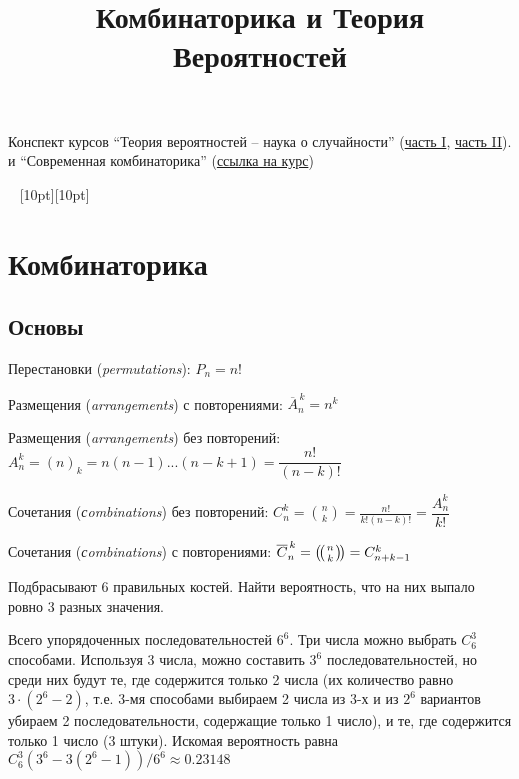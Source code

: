 \documentclass[a4paper,12pt,fleqn]{article}
\title{Комбинаторика и Теория Вероятностей}
\author{}
\date{}
\newenvironment{onsamepage} {\begin{minipage}{\textwidth}} {\end{minipage}}
\numberwithin{figure}{section}
\theoremstyle{definition}
\newcommand{\mbinom}[2] { \left( \! \middle( \genfrac{}{}{0pt}{}{#1}{#2} \middle) \! \right) }
\def\vignette{\vspace{48pt} \noindent \hrulefill~
	          \raisebox{-8pt}[10pt][10pt]{\Huge\ding{102}}
	          ~\hrulefill}
\begin{document}
\maketitle
Конспект курсов ``Теория вероятностей -- наука о случайности''
(\href{https://stepik.org/course/2911}{часть I},
\href{https://stepik.org/course/3209}{часть II}).
и ``Современная комбинаторика''
(\href{https://www.coursera.org/learn/modern-combinatorics/home/welcome}{ссылка на курс})
\tableofcontents


\vignette
\section{Комбинаторика}

\subsection{Основы}

Перестановки (\textit{permutations}): $P_n = n!$

Размещения (\textit{arrangements}) с повторениями:
$\overline{A}_n^{\,k} = n^k$

Размещения (\textit{arrangements}) без повторений:
$A_n^k = (n)_k = n(n-1)...(n-k+1) = \dfrac{n!}{(n-k)!}$

Сочетания (\textit{сombinations}) без повторений:
$C_n^k = \binom{n}{k} = \frac{n!}{k!(n-k)!} = \dfrac{A_n^k}{k!}$

Сочетания (\textit{сombinations}) с повторениями:
$\overline{C}_n^{\,k} = \mbinom{n}{k} = C_{n+k-1}^k$

\medskip
\begin{onsamepage}
\begin{problem}
	Подбрасывают 6 правильных костей.
	Найти вероятность, что на них выпало ровно 3 разных значения.
\end{problem}
\begin{solution}
	Всего упорядоченных последовательностей $6^6$.
	Три числа можно выбрать $C_6^3$ способами.
	Используя 3 числа, можно составить $3^6$ последовательностей,
	но среди них будут те, где содержится только 2 числа (их количество равно $3 \cdot (2^6-2)$,
	т.е. 3-мя способами выбираем 2 числа из 3-х и из $2^6$ вариантов убираем 2 последовательности,
	содержащие только 1 число), и те, где содержится только 1 число (3 штуки).
	Искомая вероятность равна $C_6^3(3^6-3(2^6-1))/6^6 \approx 0.23148$
\end{solution}
\end{onsamepage}
\end{document}
